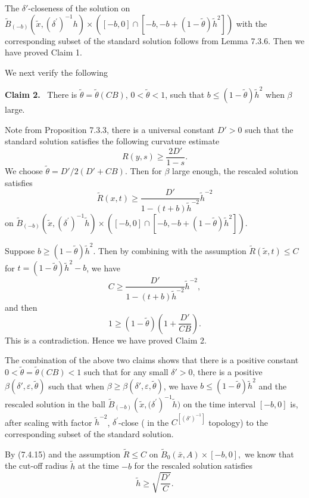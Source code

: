 The $\delta'$-closeness of the solution on $\widetilde{B}_{(-b)}
(\tilde{x},{(\delta^{\prime})}^{-1}h)\times ([-b,0]\cap[-b,
-b+(1-\tilde{\theta})\tilde{h}^{2}])$ with the corresponding
subset of the standard solution follows from Lemma 7.3.6. Then we
have proved Claim 1.

\smallskip
We next verify the following

\medskip
{\bf Claim 2.} \ There is $\tilde{\theta}=\tilde{\theta}(CB)$,
$0<\tilde{\theta}<1$, such that
$b\leq(1-\tilde{\theta})\tilde{h}^{2}$ when $\beta$ large.

\medskip
Note from Proposition 7.3.3, there is a universal constant $D'>0$
such that the standard solution satisfies the following curvature
estimate
$$
R(y,s) \geq \frac{2D'}{1-s}.
$$
We choose $\tilde{\theta}= {D'}/{2(D'+CB)}$. Then for $\beta$
large enough, the rescaled solution satisfies \begin{equation}
\widetilde{R}(x,t)\geq
\frac{D'}{1-(t+b)\tilde{h}^{-2}}\tilde{h}^{-2} %
\end{equation} on
$\widetilde{B}_{(-b)}(\tilde{x},{(\delta^{\prime})}^{-1}\tilde{h})\times
([-b,0]\cap[-b,-b+(1-\tilde{\theta})\tilde{h}^{2}])$.

Suppose $b\geq (1-\tilde{\theta})\tilde{h}^{2}$. Then by combining
with the assumption $\widetilde{R}(\tilde{x},t)\leq {C}$ for
$t=(1-\tilde{\theta})\tilde{h}^{2}-b$, we have
$$
C\geq \frac{D'}{1-(t+b)\tilde{h}^{-2}}\tilde{h}^{-2},
$$
and then
$$
1\geq(1-\tilde{\theta})\left(1+\frac{D'}{CB}\right).
$$
This is a contradiction. Hence we have proved Claim 2.

The combination of the above two claims shows that there is a
positive constant $0 <\tilde{\theta}=\tilde{\theta}(CB)<1$ such
that for any small $\delta'>0$, there is a positive
$\beta(\delta',\varepsilon, \tilde{\theta})$ such that when $\beta
\geq \beta(\delta',\varepsilon, \tilde{\theta})$, we have $b\leq
(1-\tilde{\theta})\tilde{h}^{2}$ and the rescaled solution in the
ball
$\widetilde{B}_{(-b)}(\tilde{x},{(\delta^{\prime}})^{-1}\tilde{h})$
on the time interval $[-b,0]$ is, after scaling with factor
$\tilde{h}^{-2}$, ${\delta}^{\prime}$-close ( in the
$C^{[(\delta')^{-1}]}$ topology) to the corresponding subset of
the standard solution.

By (7.4.15) and the assumption $\widetilde{R}\leq {C}$ on
$\widetilde{B}_{0}(\bar{x},A) \times [-b,0],$ we know that the
cut-off radius $\tilde{h}$ at the time $-b$ for the rescaled
solution satisfies
$$\tilde{h} \geq \sqrt{\frac{D'}{C}}.$$

